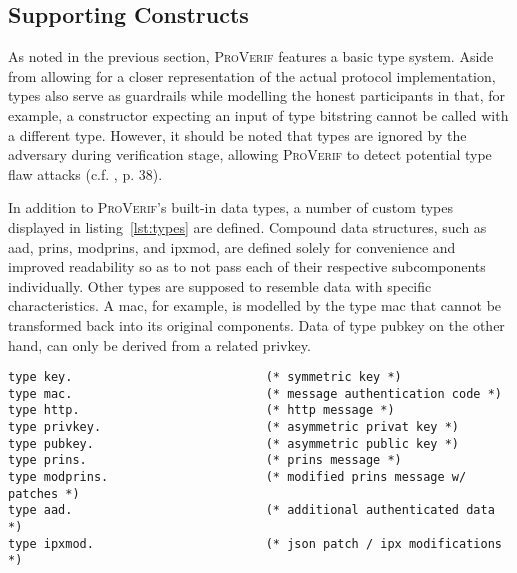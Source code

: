 \lstset{style=proverif}

\subsection{Supporting Constructs}

As noted in the previous section, \textsc{ProVerif} features a basic type system.
Aside from allowing for a closer representation of the actual protocol implementation, types also serve as guardrails while modelling the honest participants in that, for example, a constructor expecting an input of type bitstring cannot be called with a different type.
However, it should be noted that types are ignored by the adversary during verification stage, allowing \textsc{ProVerif} to detect potential type flaw attacks (c.f. \cite{blanchet2020proverif}, p. 38).

In addition to \textsc{ProVerif}'s built-in data types, a number of custom types displayed in listing~\ref{lst:types} are defined.
Compound data structures, such as {\sffamily aad}, {\sffamily prins}, {\sffamily modprins}, and {\sffamily ipxmod}, are defined solely for convenience and improved readability so as to not pass each of their respective subcomponents individually.
Other types are supposed to resemble data with specific characteristics.
A \gls{mac}, for example, is modelled by the type {\sffamily mac} that cannot be transformed back into its original components.
Data of type {\sffamily pubkey} on the other hand, can only be derived from a related {\sffamily privkey}.

\begin{lstlisting}[caption={Custom type definitions},label={lst:types},firstnumber=3]
type key.                           (* symmetric key *)
type mac.                           (* message authentication code *)
type http.                          (* http message *)
type privkey.                       (* asymmetric privat key *)
type pubkey.                        (* asymmetric public key *)
type prins.                         (* prins message *)
type modprins.                      (* modified prins message w/ patches *)
type aad.                           (* additional authenticated data *)
type ipxmod.                        (* json patch / ipx modifications *)
\end{lstlisting}


